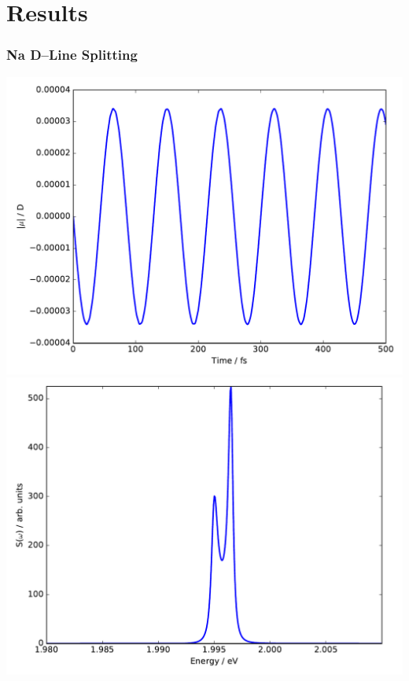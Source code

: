 \documentclass{beamer}
\begin{document}
\section{Results}

\begin{frame}
\frametitle{Na D--Line Splitting}

\begin{minipage}[h!]{0.47\textwidth}
\includegraphics[width=\textwidth]{na_fss_dipole}\\
\includegraphics[width=\textwidth]{na_fss}
\end{minipage}
\hfill
\begin{minipage}[h!]{0.50\textwidth}


\end{minipage}
\end{frame}
\end{document}
